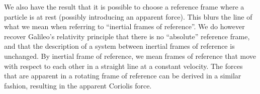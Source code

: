 We also have the result that it is possible to choose a reference frame where a particle is at rest (possibly introducing an apparent force). This blurs the line of what we mean when referring to ``inertial frames of reference''. We do however recover Galileo's relativity principle that there is no ``absolute'' reference frame, and that the description of a system between inertial frames of reference is unchanged. By inertial frame of reference, we mean frames of reference that move with respect to each other in a straight line at a constant velocity. The forces that are apparent in a rotating frame of reference can be derived in a similar fashion, resulting in the apparent Coriolis force.

